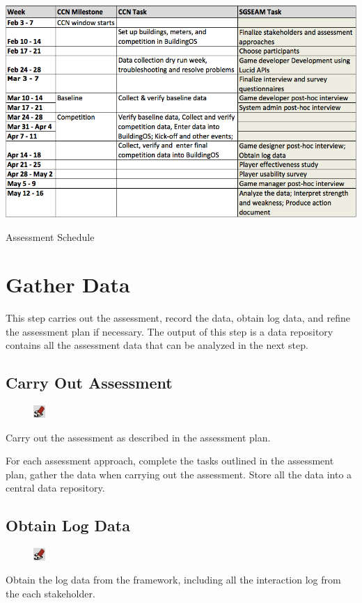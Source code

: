 \documentclass[11pt,oneside]{book}
\begin{document}
\begin{table}[ht!]
  \center
  \includegraphics[width=0.95\columnwidth]{schedule}
  \caption{Assessment Schedule}
  \label{table:schedule}
\end{table}

\chapter{Gather Data}
This step carries out the assessment, record the data, obtain log data, and refine the assessment plan if necessary. 
The output of this step is a data repository contains all the assessment data that can be analyzed in the next step.

\section{Carry Out Assessment}
\begin{shadebox}
\begin{figure}
\vspace{-15pt}\hspace{-10pt}
    \includegraphics[width=0.04\textwidth]{note-icon}
\end{figure}
Carry out the assessment as described in the assessment plan.
\end{shadebox}

For each assessment approach, complete the tasks outlined in the assessment plan, gather the data when carrying out the 
assessment. Store all the data into a central data repository. 

\section{Obtain Log Data}
\begin{shadebox}
\begin{figure}
\vspace{-15pt}\hspace{-10pt}
    \includegraphics[width=0.04\textwidth]{note-icon}
\end{figure}
Obtain the log data from the framework, including all the interaction log from the each stakeholder.
\end{shadebox}
\end{document}
